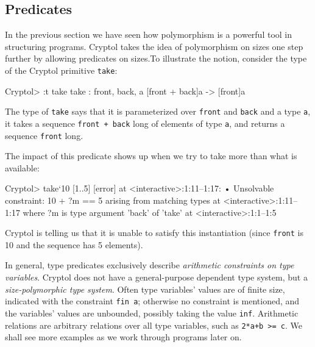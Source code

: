 \subsection{Predicates}
\label{sec:predicates}


In the previous section we have seen how polymorphism is a powerful
tool in structuring programs. Cryptol takes the idea of polymorphism
on sizes one step further by allowing predicates on
sizes.\indPredicates To illustrate the notion, consider the type of
the Cryptol primitive {\tt take}\indTake:
\restartrepl
\begin{replPrompt}
  Cryptol> :t take
  take : {front, back, a} [front + back]a -> [front]a
\end{replPrompt}

The type of {\tt take} says that it is parameterized over {\tt front}
and {\tt back} and a type {\tt a}, it takes a sequence
{\tt front + back} long of elements of type {\tt a}, and returns a
sequence {\tt front} long.

The impact of this predicate shows up when we try to take more than
what is available:
\restartrepl
\begin{replPrompt}
  Cryptol> take`{10} [1..5]
  [error] at <interactive>:1:11--1:17:
    • Unsolvable constraint:
        10 + ?m == 5
          arising from
          matching types
          at <interactive>:1:11--1:17
    where
    ?m is type argument 'back' of 'take' at <interactive>:1:1--1:5
\end{replPrompt}
Cryptol is telling us that it is unable to satisfy this instantiation
(since {\tt front} is 10 and the sequence has 5
elements).\indTake\indPredicates

In general, type predicates exclusively describe \textit{arithmetic
  constraints on type variables}.  Cryptol does not have a
general-purpose dependent type system, but a \emph{size-polymorphic
  type system}.  Often type variables' values are of finite size,
indicated with the constraint {\tt fin a}\indFin; otherwise no
constraint is mentioned, and the variables' values are unbounded,
possibly taking the value \texttt{inf}\indInf.  Arithmetic
relations are arbitrary relations over all type variables, such as
{\tt 2*a+b >= c}.  We shall see more examples as we work through
programs later on.

